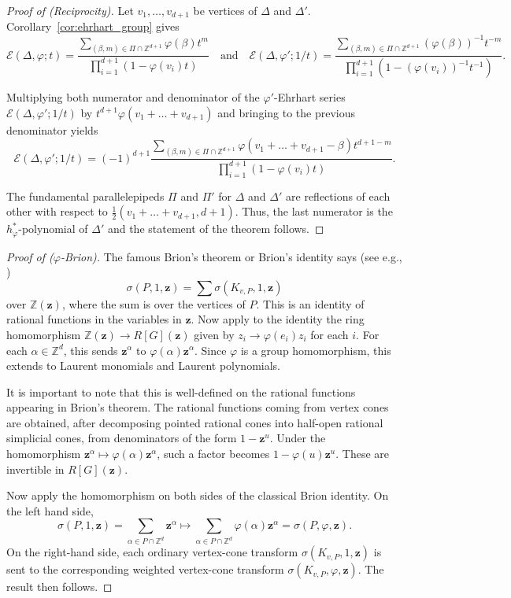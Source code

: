 \documentclass[12pt,reqno]{amsart}
\theoremstyle{definition}
\theoremstyle{remark}
\newcommand{\Z}{\mathbb{Z}}
\renewcommand{\phi}{\varphi}
\begin{document}
\begin{proof}[Proof of  (Reciprocity)]


Let $v_1,\ldots,v_{d+1}$ be vertices of $\Delta$ and $\Delta'$. Corollary~\ref{cor:ehrhart_group} gives
$$\mathcal E(\Delta,\phi;t)=\frac{\sum_{(\beta,m)\in \Pi\cap\Z^{d+1}}\phi(\beta)t^m}{\prod_{i=1}^{d+1} (1-\phi(v_i)t)} \quad \text{and} \quad \mathcal E(\Delta,\phi';1/t)=\frac{\sum_{(\beta,m)\in \Pi\cap\Z^{d+1}}(\phi(\beta))^{-1}t^{-m}}{\prod_{i=1}^{d+1} (1-(\phi(v_i))^{-1}t^{-1})}.$$


Multiplying both numerator and denominator of the $\phi'$-Ehrhart series $\mathcal E(\Delta,\phi';1/t)$ by $t^{d+1}\phi(v_1+\ldots+v_{d+1})$ and bringing to the previous denominator yields
$$
\mathcal E(\Delta,\phi';1/t)=(-1)^{d+1}\frac{\sum_{(\beta,m)\in \Pi\cap \Z^{d+1}}\phi(v_1+\ldots+v_{d+1}-\beta)t^{d+1-m}}{\prod_{i=1}^{d+1} (1-\phi(v_i)t)}.$$

The fundamental parallelepipeds $\Pi$ and $\Pi'$ for $\Delta$ and $\Delta'$ are reflections of each other with respect to $\frac12(v_1+\ldots+v_{d+1},d+1)$. 
Thus, the last numerator is the $h^*_\phi$-polynomial of $\Delta'$ and the statement of the theorem follows.
\end{proof}



\begin{proof}[Proof of  ($\varphi$-Brion)]


The famous Brion's theorem or Brion's identity says (see e.g., \cite{barvinokzurichbook,beckrobins}) $$\sigma(P,1,\mathbf{z}) =  \sum \sigma(K_{v,P},1,\mathbf{z})$$ over $\mathbb{Z}(\mathbf{z})$, where the sum is over the vertices of $P$.  This is an identity of rational functions in the variables in $\mathbf{z}$. Now apply to the identity the ring homomorphism $\Z(\mathbf{z}) \to R[G](\mathbf{z})$ given by $z_i \to \phi(e_i)z_i$ for each $i$. For each $\alpha \in \Z^d$, this sends $\mathbf{z}^{\alpha}$ to $\phi(\alpha)\mathbf{z}^{\alpha}$. Since $\phi$ is a 
group homomorphism, this extends to Laurent monomials and Laurent polynomials. 

It is important to note that this is well-defined on the rational functions appearing in Brion's theorem. The rational functions coming from vertex cones 
are obtained, after decomposing pointed rational cones into half-open rational simplicial cones, from denominators of the form $1-\mathbf{z}^u$. Under the homomorphism $\mathbf{z}^{\alpha} \mapsto \phi(\alpha)\mathbf{z}^{\alpha}$, such a factor becomes $1-\phi(u)\mathbf{z}^u$. These are invertible in $R[G](\mathbf{z})$. 

Now apply the homomorphism on both sides of the classical Brion identity. On the left hand side, 
\[
\sigma(P,1,\mathbf{z}) = \sum_{\alpha \in P \cap \Z^d} \mathbf{z}^{\alpha} \mapsto  \sum_{\alpha \in P \cap \Z^d} \phi(\alpha) \mathbf{z}^{\alpha} = \sigma(P,\phi,\mathbf{z}).
\]
On the right-hand side, each ordinary vertex-cone transform $\sigma(K_{v,P},1,\mathbf{z})$ is sent to the corresponding weighted vertex-cone transform $\sigma(K_{v,P},\phi,\mathbf{z})$. The result then follows.
\end{proof}
\end{document}
